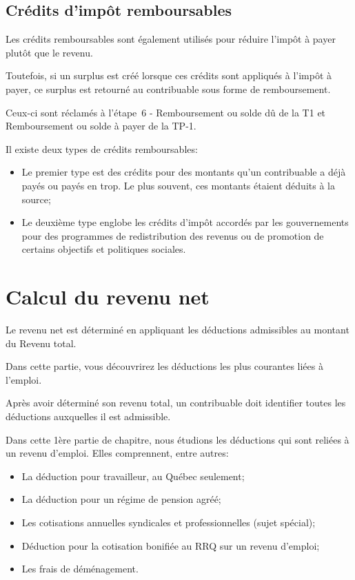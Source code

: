 \subsection{Crédits d'impôt remboursables}
Les crédits remboursables sont également utilisés pour réduire l'impôt à payer plutôt que le revenu. 

Toutefois, si un surplus est créé lorsque ces crédits sont appliqués à l'impôt à payer, ce surplus est retourné au contribuable sous forme de remboursement. 

Ceux-ci sont réclamés à l'étape~6 - \og Remboursement ou solde dû \fg{} de la T1 et \og Remboursement ou solde à payer \fg{} de la TP-1. 

Il existe deux types de crédits remboursables: 
\begin{itemize}
	\item Le premier type est des crédits pour des montants qu'un contribuable a déjà payés ou payés en trop. Le plus souvent, ces montants étaient déduits à la source; 
	\item Le deuxième type englobe les crédits d'impôt accordés par les gouvernements pour des programmes de redistribution des revenus ou de promotion de certains objectifs et politiques sociales.
\end{itemize}



\section{Calcul du revenu net}
\begin{intro}
	Le revenu net est déterminé en appliquant les déductions admissibles au montant du Revenu total. 
	
	Dans cette partie, vous découvrirez les déductions les plus courantes liées à l'emploi.
\end{intro}
Après avoir déterminé son revenu total, un contribuable doit identifier toutes les déductions auxquelles il est admissible.

Dans cette 1ère partie de chapitre, nous étudions les déductions qui sont reliées à un revenu d'emploi. Elles comprennent, entre autres:
\begin{itemize}
	\item La déduction pour travailleur, au Québec seulement;
	\item La déduction pour un régime de pension agréé;
	\item Les cotisations annuelles syndicales et professionnelles (sujet spécial);
	\item Déduction pour la cotisation bonifiée au RRQ sur un revenu d'emploi; 
	\item Les frais de déménagement.
\end{itemize}


